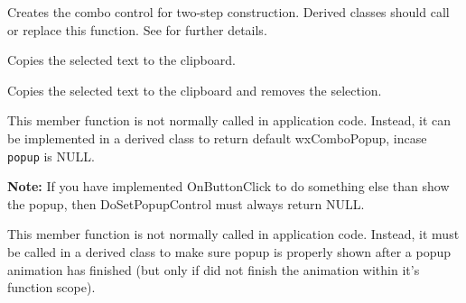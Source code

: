 \label{wxcomboctrlcreate}


Creates the combo control for two-step construction. Derived classes
should call or replace this function. See \rtfsp
for further details.


\label{wxcomboctrlcopy}


Copies the selected text to the clipboard.


\label{wxcomboctrlcut}


Copies the selected text to the clipboard and removes the selection.


\label{wxcomboctrldosetpopupcontrol}


This member function is not normally called in application code.
Instead, it can be implemented in a derived class to return
default wxComboPopup, incase {\tt popup} is NULL.

\textbf{Note:} If you have implemented OnButtonClick to do
something else than show the popup, then DoSetPopupControl
must always return NULL.


\label{wxcomboctrldoshowpopup}


This member function is not normally called in application code.
Instead, it must be called in a derived class to make sure popup
is properly shown after a popup animation has finished (but only
if  did not finish
the animation within it's function scope).



